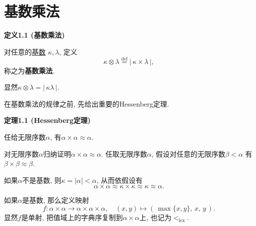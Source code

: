 


\setlength{\abovedisplayskip}{1pt}
\setlength{\belowdisplayskip}{1pt}

\section{基数乘法}

\hypertarget{sec:定义1.1}{}
\noindent\textbf{定义1.1 (基数乘法)}

对任意的\href{../01 基数/01 基数#nameddest=sec:定义1.1}{基数}
$\kappa,\lambda$, 定义
\[
    \kappa\otimes\lambda\overset{\mathrm{def}}{=}|\,\kappa\times\lambda\,|,
\]
称之为\textbf{基数乘法}.


\vspace{10pt}

显然$\kappa\otimes\lambda=|\,\kappa\lambda\,|$.

\vspace{10pt}

在基数乘法的规律之前, 先给出重要的Hessenberg定理.

\vspace{10pt}

\hypertarget{sec:定理1.1}{}
\noindent\textbf{定理1.1 (Hessenberg定理)}

任给无限序数$\alpha$, 有$\alpha\times\alpha\approx\alpha$.


对无限序数$\alpha$归纳证明$\alpha\times\alpha\approx\alpha$.
任取无限序数$\alpha$, 假设对任意的无限序数$\beta<\alpha$
有$\beta\times\beta\approx\beta$.

如果$\alpha$不是基数, 则$\kappa=|\alpha|<\alpha$, 从而依假设有
\[
    \alpha\times\alpha\approx\kappa\times\kappa\approx\kappa\approx\alpha.
\]

如果$\alpha$是基数, 那么定义映射
\[
    f:\alpha\times\alpha\to\alpha\times\alpha\times\alpha,\quad
    (x,y)\mapsto(\,\max\{x,y\},\,x,\,y\,).
\]
显然$f$是单射, 把值域上的字典序复制到$\alpha\times\alpha$上,
也记为$<_{\mathrm{lex}}$.

